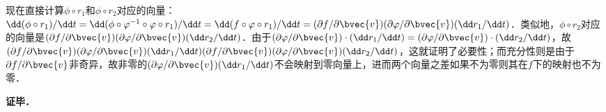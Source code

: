 现在直接计算$\phi\circ r_1$和$\phi\circ r_2$对应的向量：$\dd(\phi\circ r_1)/\dd t=\dd(\phi\circ\varphi^{-1}\circ\varphi\circ r_1)/\dd t=\dd(f\circ\varphi\circ r_1)/\dd t=(\partial f/\partial\bvec{v})(\partial\varphi/\partial\bvec{v})(\dd r_1/\dd t)$．类似地，$\phi\circ r_2$对应的向量是$(\partial f/\partial\bvec{v})(\partial\varphi/\partial\bvec{v})(\dd r_2/\dd t)$．由于$(\partial\varphi/\partial\bvec{v})\cdot(\dd r_1/\dd t)=(\partial\varphi/\partial\bvec{v})\cdot(\dd r_2/\dd t)$，故$(\partial f/\partial\bvec{v})(\partial\varphi/\partial\bvec{v})(\dd r_1/\dd t)(\partial f/\partial\bvec{v})(\partial\varphi/\partial\bvec{v})(\dd r_2/\dd t)$，这就证明了必要性；而充分性则是由于$\partial f/\partial\bvec{v}$非奇异，故非零的$(\partial\varphi/\partial\bvec{v})(\dd r_1/\dd t)$不会映射到零向量上，进而两个向量之差如果不为零则其在$f$下的映射也不为零．


\textbf{证毕．}









